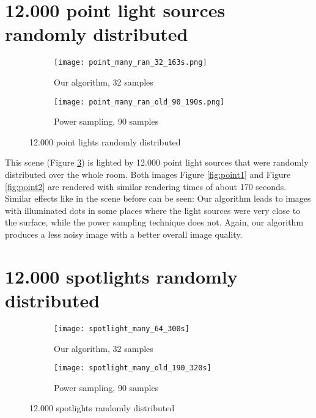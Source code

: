 \section{12.000 point light sources randomly distributed}

\begin{figure}
	\centering
	\begin{subfigure}{.5\textwidth}
		\centering
		\texttt{[image: point\_many\_ran\_32\_163s.png]}
		\caption{Our algorithm, 32 samples}
		\label{fig:point3}
	\end{subfigure}%
	\begin{subfigure}{.5\textwidth}
		\centering
		\texttt{[image: point\_many\_ran\_old\_90\_190s.png]}
		\caption{Power sampling, 90 samples}
		\label{fig:point4}
	\end{subfigure}
	\caption{12.000 point lights randomly distributed}
	\label{point}
\end{figure}

This scene (Figure \ref{point}) is lighted by 12.000 point light sources that were randomly distributed over the whole room. Both images Figure \ref{fig:point1} and Figure \ref{fig:point2} are rendered with similar rendering times of about 170 seconds. Similar effects like in the scene before can be seen: Our algorithm leads to images with illuminated dots in some places where the light sources were very close to the surface, while the power sampling technique does not. Again, our algorithm produces a less noisy image with a better overall image quality.

\section{12.000 spotlights randomly distributed}

\begin{figure}
	\centering
	\begin{subfigure}{.5\textwidth}
		\centering
		\texttt{[image: spotlight\_many\_64\_300s]}
		\caption{Our algorithm, 32 samples}
		\label{fig:spot3}
	\end{subfigure}%
	\begin{subfigure}{.5\textwidth}
		\centering
		\texttt{[image: spotlight\_many\_old\_190\_320s]}
		\caption{Power sampling, 90 samples}
		\label{fig:spot4}
	\end{subfigure}
	\caption{12.000 spotlights randomly distributed}
	\label{fig:spotl}
\end{figure}

